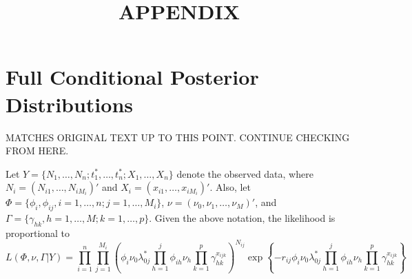 \documentclass[10pt, letterpaper]{article}
\title{APPENDIX}
\author{} %
\date{}    %
\newcommand{\correctToHere}{{\color{red}\large MATCHES ORIGINAL TEXT UP TO THIS POINT. CONTINUE CHECKING FROM HERE.}}
\begin{document}
\maketitle
\thispagestyle{empty} %

\section*{Full Conditional Posterior Distributions}

\correctToHere

Let $Y = \{ N_1, \dots, N_n; t_1^*, \dots, t_n^*; X_1, \dots, X_n \}$ denote the observed data, where $N_i = (N_{i1}, \dots, N_{iM_i})'$ and $X_i = (x_{i1}, \dots, x_{iM_i})'$. Also, let $\Phi = \{ \phi_i, \phi_{ij}, i = 1, \dots, n; j = 1, \dots, M_i \}$, $\nu = (\nu_0, \nu_1, \dots, \nu_M)'$, and $\Gamma = \{ \gamma_{hk}, h = 1, \dots, M; k = 1, \dots, p \}$. Given the above notation, the likelihood is proportional to
\begin{equation} \label{eq:A1}
L(\Phi, \nu, \Gamma | Y) = \prod_{i=1}^n \prod_{j=1}^{M_i} \left( \phi_i \nu_0 \lambda_{0j}^* \prod_{h=1}^j \phi_{ih} \nu_h \prod_{k=1}^p \gamma_{hk}^{x_{ijk}} \right)^{N_{ij}} \exp \left\{ - r_{ij} \phi_i \nu_0 \lambda_{0j}^* \prod_{h=1}^j \phi_{ih} \nu_h \prod_{k=1}^p \gamma_{hk}^{x_{ijk}} \right\}
\tag{A-1}
\end{equation}
\end{document}
